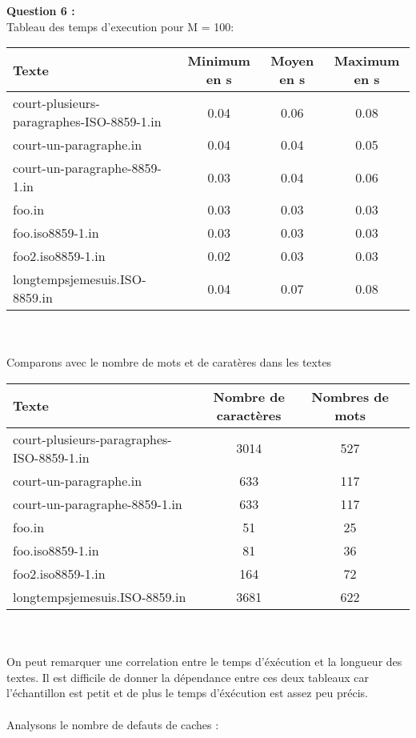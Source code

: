 \documentclass{article}
\begin{document}
\item \textbf{Question 6 : } \\
Tableau des temps d'execution pour M = 100:
\begin{center}
\begin{tabular}{|l|c|c|c|}
  \hline
  Texte & Minimum en s & Moyen en s & Maximum en s \\
  \hline
  court-plusieurs-paragraphes-ISO-8859-1.in & 0.04 & 0.06 & 0.08 \\
  court-un-paragraphe.in  & 0.04 & 0.04  & 0.05\\
  court-un-paragraphe-8859-1.in & 0.03 & 0.04 & 0.06\\
  foo.in & 0.03 & 0.03 & 0.03\\
  foo.iso8859-1.in & 0.03 & 0.03 & 0.03\\
  foo2.iso8859-1.in & 0.02 & 0.03 & 0.03\\
  longtempsjemesuis.ISO-8859.in & 0.04 & 0.07 & 0.08\\
  \hline
\end{tabular}
\end{center}
\\ \\
Comparons avec le nombre de mots et de carat\`eres dans les textes\\
\begin{tabular}{|l|c|c|c|}
  \hline
  Texte & Nombre de caract\`eres & Nombres de mots \\
  \hline
  court-plusieurs-paragraphes-ISO-8859-1.in &  3014 & 527\\
  court-un-paragraphe.in & 633 & 117 \\
  court-un-paragraphe-8859-1.in & 633 & 117\\
  foo.in & 51 & 25\\
  foo.iso8859-1.in & 81 & 36 \\
  foo2.iso8859-1.in & 164 & 72\\
  longtempsjemesuis.ISO-8859.in & 3681 & 622\\
  \hline
\end{tabular}
\\ \\
On peut remarquer une correlation entre le temps d'\'ex\'ecution et la longueur des textes. Il est difficile de donner la d\'ependance entre ces deux tableaux car l'\'echantillon est petit et de plus le temps d'\'ex\'ecution est assez peu pr\'ecis.
\\ \\
Analysons le nombre de defauts de caches :\\
\end{document}
